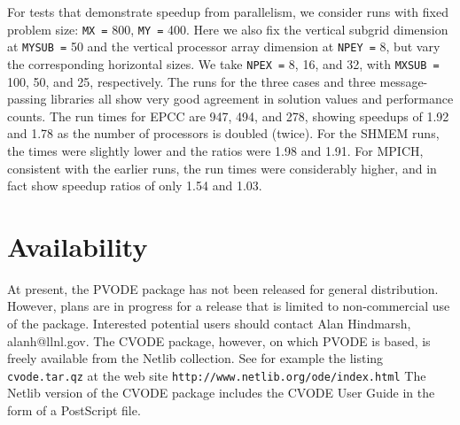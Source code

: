 For tests that demonstrate speedup from parallelism, we consider runs with
fixed problem size: {\tt MX =} 800, {\tt MY =} 400. Here we also fix the
vertical subgrid dimension at {\tt MYSUB =} 50 and the vertical processor
array dimension at {\tt NPEY =} 8, but vary the corresponding horizontal
sizes. We take {\tt NPEX =} 8, 16, and 32, with {\tt MXSUB =} 100, 50, and
25, respectively. The runs for the three cases and three message-passing
libraries all show very good agreement in solution values and performance
counts. The run times for EPCC are 947, 494, and 278, showing speedups of
1.92 and 1.78 as the number of processors is doubled (twice). For the SHMEM
runs, the times were slightly lower and the ratios were 1.98 and 1.91. For
MPICH, consistent with the earlier runs, the run times were considerably
higher, and in fact show speedup ratios of only 1.54 and 1.03.


\section{Availability}

At present, the PVODE package has not been released for general
distribution.  However, plans are in progress for a release that is
limited to non-commercial use of the package.  Interested potential
users should contact Alan Hindmarsh, alanh@llnl.gov. The CVODE
package, however, on which PVODE is based, is freely available from
the Netlib collection. See for example the listing {\tt cvode.tar.qz}
at the web site
\newline \hspace*{1.0in} {\tt http://www.netlib.org/ode/index.html} 
\newline The Netlib version of the CVODE package includes the CVODE User Guide
\cite{CVODE_UG} in the form of a PostScript file.


